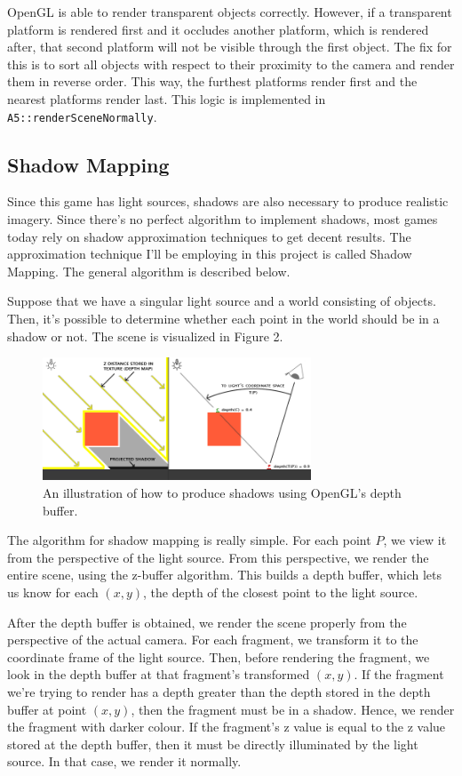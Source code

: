 \documentclass[11pt]{report}
\begin{document}
OpenGL is able to render transparent objects correctly. However, if a transparent platform is rendered first and it occludes another platform, which is rendered after, that second platform will not be visible through the first object. The fix for this is to sort all objects with respect to their proximity to the camera and render them in reverse order. This way, the furthest platforms render first and the nearest platforms render last.  This logic is implemented in \verb|A5::renderSceneNormally|.

\subsection{Shadow Mapping}
Since this game has light sources, shadows are also necessary to produce realistic imagery. Since there's no perfect algorithm to implement shadows, most games today rely on shadow approximation techniques to get decent results. The approximation technique I'll be employing in this project is called Shadow Mapping. The general algorithm is described below.

Suppose that we have a singular light source and a world consisting of objects. Then, it's possible to determine whether each point in the world should be in a shadow or not. The scene is visualized in Figure 2.

\begin{figure}[H]
\includegraphics[width=8cm]{shadow_mapping_theory_spaces}
\centering
\caption{An illustration of how to produce shadows using OpenGL's depth buffer\cite{shadow-map-learn-opengl}.}
\end{figure}

The algorithm for shadow mapping is really simple. For each point $P$, we view it from the perspective of the light source. From this perspective, we render the entire scene, using the z-buffer algorithm. This builds a depth buffer, which lets us know for each $(x, y)$, the depth of the closest point to the light source.

After the depth buffer is obtained, we render the scene properly from the perspective of the actual camera. For each fragment, we transform it to the coordinate frame of the light source. Then, before rendering the fragment, we look in the depth buffer at that fragment's transformed $(x, y)$. If the fragment we're trying to render has a depth greater than the depth stored in the depth buffer at point $(x, y)$, then the fragment must be in a shadow. Hence, we render the fragment with darker colour. If the fragment's z value is equal to the z value stored at the depth buffer, then it must be directly illuminated by the light source. In that case, we render it normally.
\end{document}
